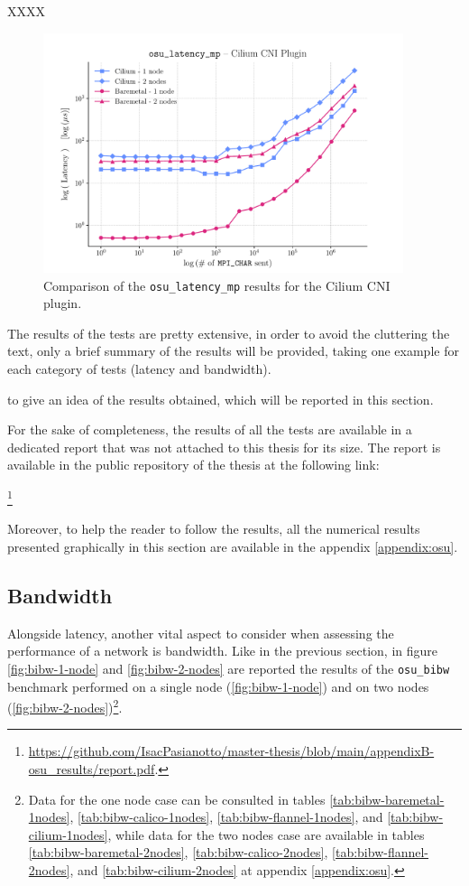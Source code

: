 XXXX


\begin{figure}
  \centering
  \includegraphics[width=0.94\textwidth]{img/chpt3/cilium-latency_mp}
  \caption{Comparison of the \texttt{osu\_latency\_mp} results for the Cilium
    CNI plugin.}
  \label{fig:cilium-latency}
\end{figure}


The results of the tests are pretty extensive, in order to avoid the cluttering
the text, only a brief summary of the results will be provided, taking one
example for each category of tests (latency and bandwidth).

to give an
idea of the results obtained, which will be reported in this section.

For the sake of completeness, the results of all the tests are available in a
dedicated report that was not attached to this thesis for its size.  The report
is available in the public repository of the thesis at the following link:

\footnote{\url{https://github.com/IsacPasianotto/master-thesis/blob/main/appendixB-osu_results/report.pdf}.}

Moreover, to help the reader to follow the results, all the numerical results
presented graphically in this section are available in the appendix
\ref{appendix:osu}.


\clearpage

\subsection{Bandwidth}\label{subsec:results-bandwidth}

Alongside latency, another vital aspect to consider when assessing the
performance of a network is bandwidth.
Like in the previous section, in figure \ref{fig:bibw-1-node} and
\ref{fig:bibw-2-nodes} are reported the results of the \texttt{osu\_bibw}
benchmark performed on a single node (\ref{fig:bibw-1-node}) and on two nodes
(\ref{fig:bibw-2-nodes})\footnote{
  Data for the one node case can be consulted in
  tables \ref{tab:bibw-baremetal-1nodes}, \ref{tab:bibw-calico-1nodes},
  \ref{tab:bibw-flannel-1nodes}, and \ref{tab:bibw-cilium-1nodes}, while data
  for the two nodes case are available in tables
  \ref{tab:bibw-baremetal-2nodes}, \ref{tab:bibw-calico-2nodes},
  \ref{tab:bibw-flannel-2nodes}, and \ref{tab:bibw-cilium-2nodes} at appendix
  \ref{appendix:osu}.
}.

